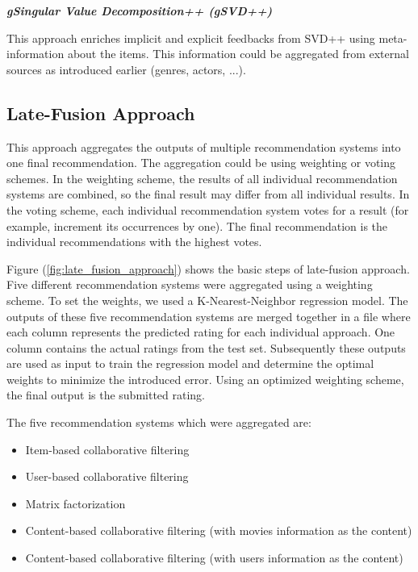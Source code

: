 \documentclass{sigish}
\begin{document}
\textbf{\emph{gSingular Value Decomposition++ (gSVD++) }}

This approach enriches implicit and explicit feedbacks from SVD++ using meta-information about the items. This information could be aggregated from external sources as introduced earlier (genres, actors, ...).

\subsection{Late-Fusion Approach}

This approach aggregates the outputs of multiple recommendation systems into one final recommendation. The aggregation could be using weighting or voting schemes. In the weighting scheme, the results of all individual recommendation systems are combined, so the final result may differ from all individual results. In the voting scheme, each individual recommendation system votes for a result (for example, increment its occurrences by one). The final recommendation is the individual recommendations with the highest votes.

Figure (\ref{fig:late_fusion_approach}) shows the basic steps of late-fusion approach. Five different recommendation systems were aggregated using a weighting scheme. To set the weights, we used a K-Nearest-Neighbor regression model. The outputs of these five recommendation systems are merged together in a file where each column represents the predicted rating for each individual approach. One column contains the actual ratings from the test set. Subsequently these outputs are used as input to train the regression model and determine the optimal weights to minimize the introduced error. Using an optimized weighting scheme, the final output is the submitted rating.

The five recommendation systems which were aggregated are:
\begin{itemize}
	\item Item-based collaborative filtering
	\item User-based collaborative filtering
	\item Matrix factorization
	\item Content-based collaborative filtering (with movies information as the content)
	\item Content-based collaborative filtering (with users information as the content)
\end{itemize}
\end{document}
